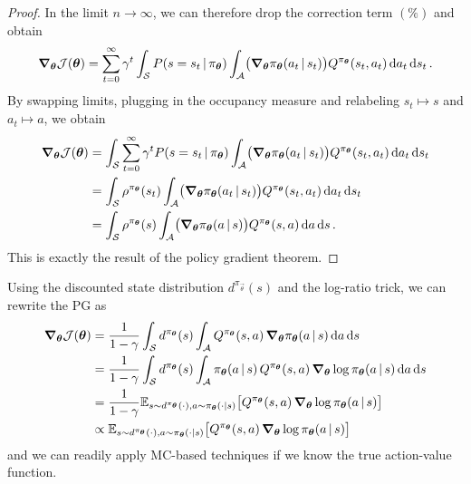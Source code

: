 \begin{proof}
			In the limit \(n \to \infty\), we can therefore drop the correction term \((\%)\) and obtain
			\begin{equation}
				\grad_{\bm{\theta}} \mathcal{J}(\bm{\theta}) = \sum_{t = 0}^{\infty} \gamma^t \int_{\mathcal{S}} P(s = s_t \,\vert\, \pi_{\bm{\theta}}) \int_{\mathcal{A}} \bigl( \grad_{\bm{\theta}} \pi_{\bm{\theta}}(a_t \,\vert\, s_t) \bigr) Q^{\pi_{\bm{\theta}}}(s_t, a_t) \dd{a_t} \dd{s_t}.
			\end{equation}
			By swapping limits, plugging in the occupancy measure and relabeling \(s_t \mapsto s\) and \(a_t \mapsto a\), we obtain
			\begin{align}
				\grad_{\bm{\theta}} \mathcal{J}(\bm{\theta})
					&= \int_{\mathcal{S}} \sum_{t = 0}^{\infty} \gamma^t P(s = s_t \,\vert\, \pi_{\bm{\theta}}) \int_{\mathcal{A}} \bigl( \grad_{\bm{\theta}} \pi_{\bm{\theta}}(a_t \,\vert\, s_t) \bigr) Q^{\pi_{\bm{\theta}}}(s_t, a_t) \dd{a_t} \dd{s_t} \\
					&= \int_{\mathcal{S}} \rho^{\pi_{\bm{\theta}}}(s_t) \int_{\mathcal{A}} \bigl( \grad_{\bm{\theta}} \pi_{\bm{\theta}}(a_t \,\vert\, s_t) \bigr) Q^{\pi_{\bm{\theta}}}(s_t, a_t) \dd{a_t} \dd{s_t} \\
					&= \int_{\mathcal{S}} \rho^{\pi_{\bm{\theta}}}(s) \int_{\mathcal{A}} \bigl( \grad_{\bm{\theta}} \pi_{\bm{\theta}}(a \,\vert\, s) \bigr) Q^{\pi_{\bm{\theta}}}(s, a) \dd{a} \dd{s}.
			\end{align}
			This is exactly the result of the policy gradient theorem.
		\end{proof}
		\begin{remark}
			Using the discounted state distribution \( d^{\pi_{\vec{\theta}}}(s) \) and the log-ratio trick, we can rewrite the \ac{PG} as
			\begin{align}
				\grad_{\bm{\theta}} \mathcal{J}(\bm{\theta})
					&= \frac{1}{1 - \gamma} \int_\mathcal{S} d^{\pi_{\bm{\theta}}}(s) \int_\mathcal{A} Q^{\pi_{\bm{\theta}}}(s, a) \, \grad_{\bm{\theta}} \pi_{\bm{\theta}}(a \,\vert\, s) \dd{a} \dd{s} \\
					&= \frac{1}{1 - \gamma} \int_\mathcal{S} d^{\pi_{\bm{\theta}}}(s) \int_\mathcal{A} \pi_{\bm{\theta}}(a \,\vert\, s) \, Q^{\pi_{\bm{\theta}}}(s, a) \, \grad_{\bm{\theta}} \log \pi_{\bm{\theta}}(a \,\vert\, s) \dd{a} \dd{s} \\
					&= \frac{1}{1 - \gamma} \mathbb{E}_{s \sim d^{\pi_{\bm{\theta}}}(\cdot), a \sim \pi_{\bm{\theta}}(\cdot \vert s)}\bigl[ Q^{\pi_{\bm{\theta}}}(s, a) \, \grad_{\bm{\theta}} \log \pi_{\bm{\theta}}(a \,\vert\, s) \bigr] \\
					&\propto \mathbb{E}_{s \sim d^{\pi_{\bm{\theta}}}(\cdot), a \sim \pi_{\bm{\theta}}(\cdot \vert s)}\bigl[ Q^{\pi_{\bm{\theta}}}(s, a) \, \grad_{\bm{\theta}} \log \pi_{\bm{\theta}}(a \,\vert\, s) \bigr]  \label{eq:pgt}
			\end{align}
			and we can readily apply \ac{MC}-based techniques if we know the true action-value function.
		\end{remark}

